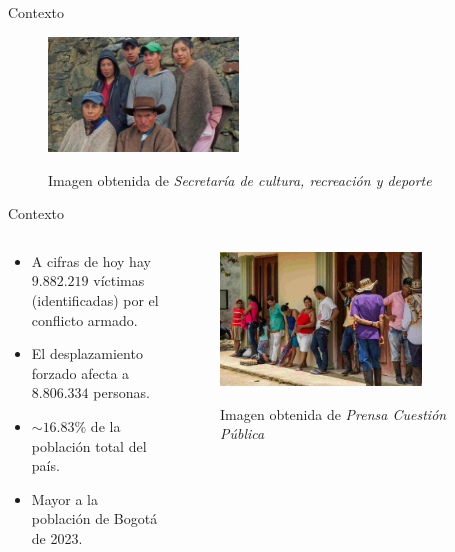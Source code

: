 \documentclass[17pt, t, lualatex]{beamer}
\begin{document}
\begin{frame}{Contexto}

  \begin{figure}[ht]
    \centering
    \includegraphics[width=0.45\textwidth]{img/campesinos.jpg}
    \caption{Imagen obtenida de \textit{Secretaría de cultura, recreación y deporte}}
    \cite{culturarecreacion_campesinos_2025}
    \label{fig:4}
  \end{figure}
\end{frame}

\begin{frame}{Contexto}

  \begin{columns}
    \begin{column}{0.5\textwidth}
      \begin{itemize}
        \item A cifras de hoy hay \(9.882.219\) víctimas (identificadas) por el conflicto armado.\cite{unidadvictimas_ruv_2025}
        \item El desplazamiento forzado afecta a \(8.806.334\) personas.\cite{unidadvictimas_ruv_2025}
        \item \(\sim 16.83\%\) de la población total del país.\cite{eswiki:165709323}
        \item Mayor a la población de Bogotá de 2023.\cite{eswiki:165573820}
      \end{itemize}
    \end{column}

    \begin{column}{0.5\textwidth}
      \begin{figure}[ht]
        \centering
        \includegraphics[width=0.8\textwidth]{img/mercado.jpg}
        \caption{Imagen obtenida de \textit{Prensa Cuestión Pública}}
        \cite{cuestionpublica_entrega_2019}
        \label{fig:5}
      \end{figure}
    \end{column}
  \end{columns}
  
\end{frame}
\end{document}
